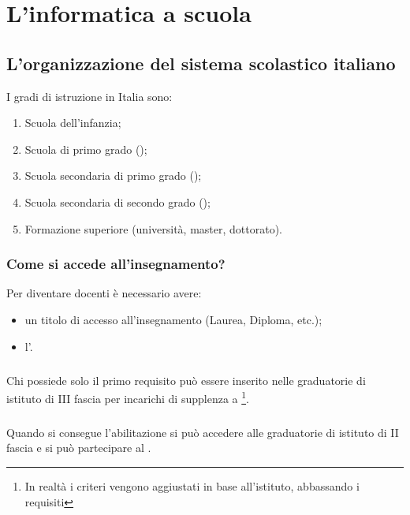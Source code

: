\chapter{L'informatica a scuola}

\section{L'organizzazione del sistema scolastico italiano}

I gradi di istruzione in Italia sono:
\begin{enumerate}
    \item Scuola dell'infanzia;
    \item Scuola di primo grado ();
    \item Scuola secondaria di primo grado ();
    \item Scuola secondaria di secondo grado ();
    \item Formazione superiore (università, master, dottorato).
\end{enumerate}

\subsection{Come si accede all'insegnamento?}

Per diventare docenti è necessario avere:
\begin{itemize}
    \item un titolo di accesso all'insegnamento (Laurea, Diploma, etc.);
    \item  l'.
\end{itemize}
\paragraph{}
Chi possiede solo il primo requisito può essere inserito nelle graduatorie di istituto di III fascia per incarichi di supplenza a \footnote{In realtà i criteri vengono aggiustati in base all'istituto, abbassando i requisiti}.
\paragraph{}
Quando si consegue l'abilitazione si può accedere alle graduatorie di istituto di II fascia e si può partecipare al .


